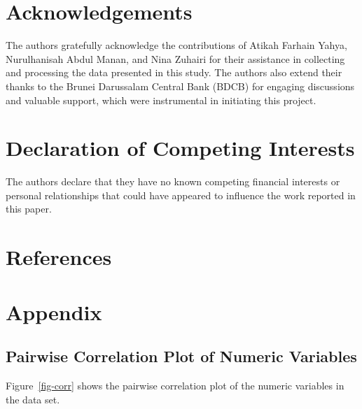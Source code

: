 \documentclass[
  number]{elsarticle}
\begin{document}
\section*{Acknowledgements}\label{acknowledgements}

The authors gratefully acknowledge the contributions of Atikah Farhain
Yahya, Nurulhanisah Abdul Manan, and Nina Zuhairi for their assistance
in collecting and processing the data presented in this study. The
authors also extend their thanks to the Brunei Darussalam Central Bank
(BDCB) for engaging discussions and valuable support, which were
instrumental in initiating this project.

\section*{Declaration of Competing
Interests}\label{declaration-of-competing-interests}

The authors declare that they have no known competing financial
interests or personal relationships that could have appeared to
influence the work reported in this paper.

\section*{References}\label{references}

\renewcommand{\bibsection}{}


\section*{Appendix}\label{appendix}

\subsection{Pairwise Correlation Plot of Numeric
Variables}\label{pairwise-correlation-plot-of-numeric-variables}

Figure~\ref{fig-corr} shows the pairwise correlation plot of the numeric
variables in the data set.
\end{document}
